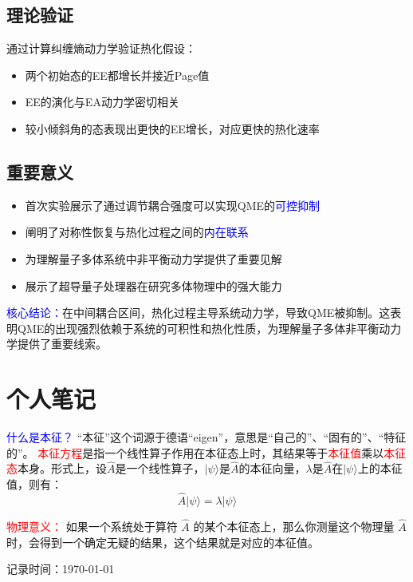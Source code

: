 \documentclass[11pt,a4paper]{article}
\begin{document}
\subsection{理论验证}
通过计算纠缠熵动力学验证热化假设：
\begin{itemize}
    \item 两个初始态的EE都增长并接近Page值
    \item EE的演化与EA动力学密切相关
    \item 较小倾斜角的态表现出更快的EE增长，对应更快的热化速率
\end{itemize}

\subsection{重要意义}
\begin{itemize}
    \item 首次实验展示了通过调节耦合强度可以实现QME的\textcolor{blue}{可控抑制}
    \item 阐明了对称性恢复与热化过程之间的\textcolor{blue}{内在联系}
    \item 为理解量子多体系统中非平衡动力学提供了重要见解
    \item 展示了超导量子处理器在研究多体物理中的强大能力
\end{itemize}

\textcolor{blue}{核心结论：}在中间耦合区间，热化过程主导系统动力学，导致QME被抑制。这表明QME的出现强烈依赖于系统的可积性和热化性质，为理解量子多体非平衡动力学提供了重要线索。




\section{个人笔记 }
\textcolor{blue}{什么是本征？}
“本征”这个词源于德语“eigen”，意思是“自己的”、“固有的”、“特征的”。
\textcolor{red}{本征方程}是指一个线性算子作用在本征态上时，其结果等于\textcolor{red}{本征值}乘以\textcolor{red}{本征态}本身。形式上，设$\hat{A}$是一个线性算子，$| \psi \rangle$是$\hat{A}$的本征向量，$\lambda$是$\hat{A}$在$| \psi \rangle$上的本征值，则有：
\begin{equation}
\hat{A} | \psi \rangle = \lambda | \psi \rangle
\end{equation}

\textcolor{red}{物理意义：}
如果一个系统处于算符 $\hat{A}$ 的某个本征态上，那么你测量这个物理量 $\hat{A}$ 时，会得到一个确定无疑的结果，这个结果就是对应的本征值。

\vfill
{\small 记录时间：\today\ \currenttime}
\end{document}
